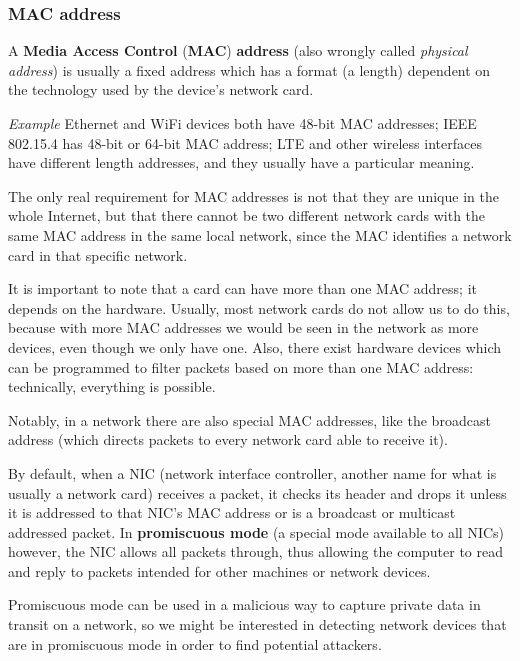 
\subsubsection{MAC address}
A \textbf{Media Access Control} (\textbf{MAC}) \textbf{address} (also wrongly called \textit{physical address}) is usually a fixed address which has a format (a length) dependent on the technology used by the device's network card.

\vspace{0.5em}

\emph{Example} Ethernet and WiFi devices both have 48-bit MAC addresses; IEEE 802.15.4 has 48-bit or 64-bit MAC address; LTE and other wireless interfaces have different length addresses, and they usually have a particular meaning.

\vspace{0.5em}

The only real requirement for MAC addresses is not that they are unique in the whole Internet, but that there cannot be two different network cards with the same MAC address in the same local network, since the MAC identifies a network card in that specific network.

It is important to note that a card can have more than one MAC address; it depends on the hardware. Usually, most network cards do not allow us to do this, because with more MAC addresses we would be seen in the network as more devices, even though we only have one. Also, there exist hardware devices which can be programmed to filter packets based on more than one MAC address: technically, everything is possible.

Notably, in a network there are also special MAC addresses, like the broadcast address (which directs packets to every network card able to receive it).

By default, when a NIC (network interface controller, another name for what is usually a network card) receives a packet, it checks its header and drops it unless it is addressed to that NIC's MAC address or is a broadcast or multicast addressed packet. In \textbf{promiscuous mode} (a special mode available to all NICs) however, the NIC allows all packets through, thus allowing the computer to read and reply to packets intended for other machines or network devices.

Promiscuous mode can be used in a malicious way to capture private data in transit on a network, so we might be interested in detecting network devices that are in promiscuous mode in order to find potential attackers.

